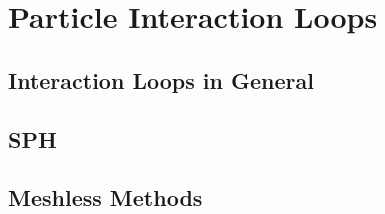 \newpage
\section{Particle Interaction Loops}\label{chap:particle_loops}

\subsection{Interaction Loops in General}

\subsection{SPH}

\subsection{Meshless Methods}
